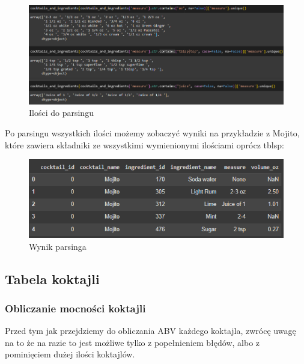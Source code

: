 \documentclass{article}
\begin{document}
\begin{figure}[htbp]
\centering
    \includegraphics[width=0.6\linewidth]{c_i_2.png}
    \caption{Ilości do parsingu}
\end{figure}


\clearpage

Po parsingu wszystkich ilości możemy zobaczyć wyniki na przykładzie z Mojito, które zawiera składniki ze wszystkimi wymienionymi ilościami oprócz tblsp:

\begin{figure}[htbp]
\centering
    \includegraphics[width=0.7\linewidth]{c_i_3.png}
    \caption{Wynik parsinga}
\end{figure}



\subsection{Tabela koktajli}
\subsubsection{Obliczanie mocności koktajli}

Przed tym jak przejdziemy do obliczania ABV każdego koktajla, zwrócę uwagę na to że na razie to jest możliwe tylko z popełnieniem błędów, albo z pominięciem dużej ilości koktajlów.
\end{document}

